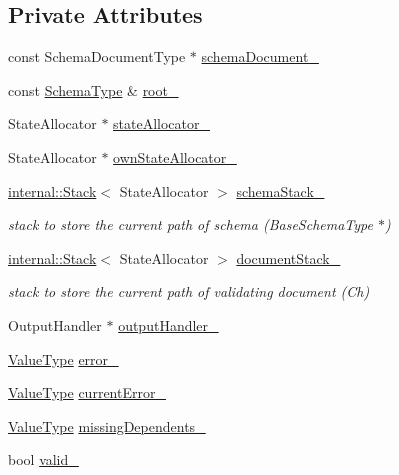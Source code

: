 \subsection*{Private Attributes}
\begin{DoxyCompactItemize}
\item 
const Schema\+Document\+Type $\ast$ \mbox{\hyperlink{classrapidjson_1_1_generic_schema_validator_aef3aea9b0dd2710cff32aa4f49e58582}{schema\+Document\+\_\+}}
\item 
const \mbox{\hyperlink{classrapidjson_1_1_generic_schema_validator_a0619c9faf3014ef141d1c6d05ae04ddc}{Schema\+Type}} \& \mbox{\hyperlink{classrapidjson_1_1_generic_schema_validator_a3590ac2591e4b33550c708bbf6351161}{root\+\_\+}}
\item 
State\+Allocator $\ast$ \mbox{\hyperlink{classrapidjson_1_1_generic_schema_validator_ab6da96a75a4585a70daee9d7595ed899}{state\+Allocator\+\_\+}}
\item 
State\+Allocator $\ast$ \mbox{\hyperlink{classrapidjson_1_1_generic_schema_validator_a53726f7b4fe6fd3bcead57dd8de27dc8}{own\+State\+Allocator\+\_\+}}
\item 
\mbox{\hyperlink{classrapidjson_1_1internal_1_1_stack}{internal\+::\+Stack}}$<$ State\+Allocator $>$ \mbox{\hyperlink{classrapidjson_1_1_generic_schema_validator_a42b18dfbf4648142964b6517473b1f14}{schema\+Stack\+\_\+}}
\begin{DoxyCompactList}\small\item\em stack to store the current path of schema (Base\+Schema\+Type $\ast$) \end{DoxyCompactList}\item 
\mbox{\hyperlink{classrapidjson_1_1internal_1_1_stack}{internal\+::\+Stack}}$<$ State\+Allocator $>$ \mbox{\hyperlink{classrapidjson_1_1_generic_schema_validator_aabd5d04fac9fd5f6c8089b28a7a21319}{document\+Stack\+\_\+}}
\begin{DoxyCompactList}\small\item\em stack to store the current path of validating document (Ch) \end{DoxyCompactList}\item 
Output\+Handler $\ast$ \mbox{\hyperlink{classrapidjson_1_1_generic_schema_validator_af37f042cc3f084c43db6bb77589c7d60}{output\+Handler\+\_\+}}
\item 
\mbox{\hyperlink{classrapidjson_1_1_generic_schema_validator_a14216aea798d69f102987c1aae36e897}{Value\+Type}} \mbox{\hyperlink{classrapidjson_1_1_generic_schema_validator_a7c3b67480cc73d789ba9d3b66bd7706f}{error\+\_\+}}
\item 
\mbox{\hyperlink{classrapidjson_1_1_generic_schema_validator_a14216aea798d69f102987c1aae36e897}{Value\+Type}} \mbox{\hyperlink{classrapidjson_1_1_generic_schema_validator_a4d8efd612ee7e707ad15669560502d80}{current\+Error\+\_\+}}
\item 
\mbox{\hyperlink{classrapidjson_1_1_generic_schema_validator_a14216aea798d69f102987c1aae36e897}{Value\+Type}} \mbox{\hyperlink{classrapidjson_1_1_generic_schema_validator_a733bfc17572fc619e3b0d43d08ec94fd}{missing\+Dependents\+\_\+}}
\item 
bool \mbox{\hyperlink{classrapidjson_1_1_generic_schema_validator_aa44db889fe75a923df60f6ec668eac92}{valid\+\_\+}}
\end{DoxyCompactItemize}

